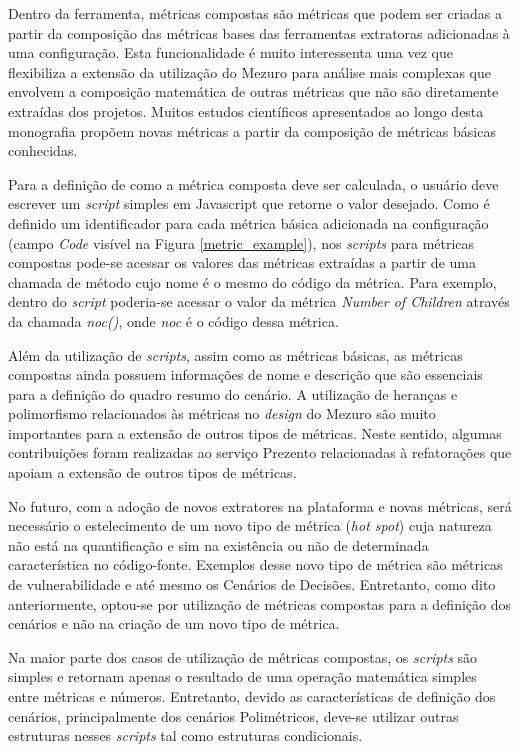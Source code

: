 Dentro da ferramenta, métricas compostas são métricas que podem ser criadas a partir da composição das métricas bases das ferramentas extratoras adicionadas à uma configuração. Esta funcionalidade é muito interessenta uma vez que flexibiliza a extensão da utilização do Mezuro para análise mais complexas que envolvem a composição matemática de outras métricas que não são diretamente extraídas dos projetos. Muitos estudos científicos apresentados ao longo desta monografia propõem novas métricas a partir da composição de métricas básicas conhecidas.

Para a definição de como a métrica composta deve ser calculada, o usuário deve escrever um \emph{script} simples em Javascript que retorne o valor desejado. Como é definido um identificador para cada métrica básica adicionada na configuração (campo \emph{Code} visível na Figura \ref{metric_example}), nos \emph{scripts} para métricas compostas pode-se acessar os valores das métricas extraídas a partir de uma chamada de método cujo nome é o mesmo do código da métrica. Para exemplo, dentro do \emph{script} poderia-se acessar o valor da métrica \emph{Number of Children} através da chamada \emph{noc()}, onde \emph{noc} é o código dessa métrica.

Além da utilização de \emph{scripts}, assim como as métricas básicas, as métricas compostas ainda possuem informações de nome e descrição que são essenciais para a definição do quadro resumo do cenário. A utilização de heranças e polimorfismo relacionados às métricas no \emph{design} do Mezuro são muito importantes para a extensão de outros tipos de métricas. Neste sentido, algumas contribuições foram realizadas ao serviço Prezento relacionadas à refatorações que apoiam a extensão de outros tipos de métricas. 

No futuro, com a adoção de novos extratores na plataforma e novas métricas, será necessário o estelecimento de um novo tipo de métrica (\emph{hot spot}) cuja natureza não está na quantificação e sim na existência ou não de determinada característica no código-fonte. Exemplos desse novo tipo de métrica são métricas de vulnerabilidade e até mesmo os Cenários de Decisões. Entretanto, como dito anteriormente, optou-se por utilização de métricas compostas para a definição dos cenários e não na criação de um novo tipo de métrica.

Na maior parte dos casos de utilização de métricas compostas, os \emph{scripts} são simples e retornam apenas o resultado de uma operação matemática simples entre métricas e números. Entretanto, devido as características de definição dos cenários, principalmente dos cenários Polimétricos, deve-se utilizar outras estruturas nesses \emph{scripts} tal como estruturas condicionais.

